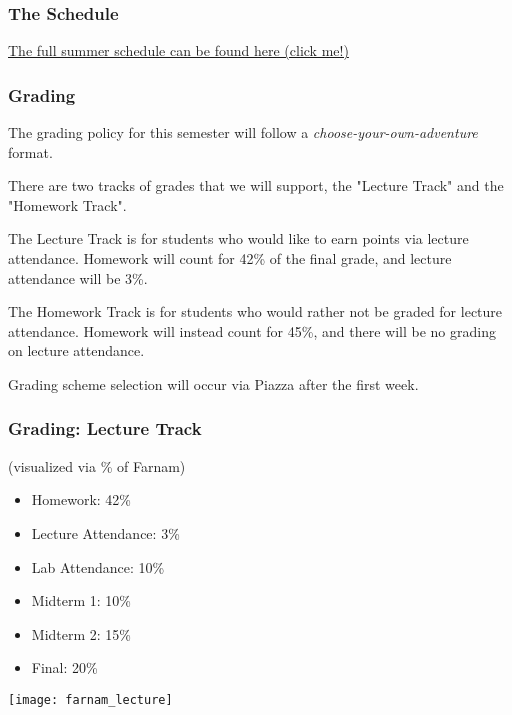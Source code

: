 \documentclass[aspectratio=169]{beamer}
\begin{document}
\begin{frame}[fragile]
  \frametitle{The Schedule}
  \begin{center}
    \large
    \color{blue}
    \href{https://docs.google.com/spreadsheets/d/1Q6utpsc1vm2WbW2aDyR4mGiFoDJSiBsVSiQmkBarqT0/edit?usp=sharing}{The full summer schedule can be found here (click me!)}
  \end{center}
\end{frame}

\begin{frame}[fragile]
  \frametitle{Grading}

  The grading policy for this semester will follow a \textit{choose-your-own-adventure} format.
  
  \pause
  \vspace{\fill}

  There are two tracks of grades that we will support, the "Lecture Track" and the "Homework Track".

  \pause
  \vspace{\fill}

  The Lecture Track is for students who would like to earn points via lecture attendance. Homework
  will count for 42\% of the final grade, and lecture attendance will be 3\%.

  \vspace{5pt}

  The Homework Track is for students who would rather not be graded for lecture attendance. Homework
  will instead count for 45\%, and there will be no grading on lecture attendance.

  \vspace{\fill}

  Grading scheme selection will occur via Piazza after the first week.
\end{frame}

\begin{frame}[fragile]
  \frametitle{Grading: Lecture Track}

  \begin{minipage}{0.59\textwidth}
    (visualized via \% of Farnam) \\

    \vspace{\fill}

    \begin{itemize}
      \item Homework: 42\%
      \item Lecture Attendance: 3\%
      \item Lab Attendance: 10\%
      \item Midterm 1: 10\%
      \item Midterm 2: 15\%
      \item Final: 20\%
    \end{itemize}
  \end{minipage}
  \begin{minipage}{0.4\textwidth}
    \texttt{[image: farnam\_lecture]}
  \end{minipage}
\end{frame}
\end{document}
